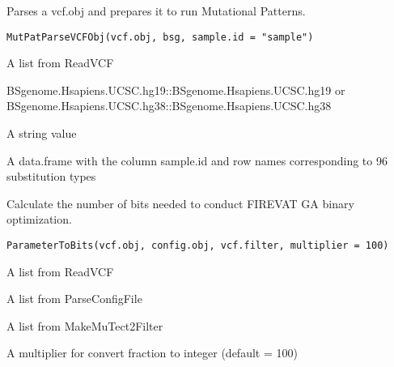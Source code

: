 \documentclass[letterpaper]{book}
\begin{document}
%
\begin{Description}\relax
Parses a vcf.obj and prepares it to run Mutational Patterns.
\end{Description}
%
\begin{Usage}
\begin{verbatim}
MutPatParseVCFObj(vcf.obj, bsg, sample.id = "sample")
\end{verbatim}
\end{Usage}
%
\begin{Arguments}
\begin{ldescription}
\item[\code{vcf.obj}] A list from ReadVCF

\item[\code{bsg}] BSgenome.Hsapiens.UCSC.hg19::BSgenome.Hsapiens.UCSC.hg19 or
BSgenome.Hsapiens.UCSC.hg38::BSgenome.Hsapiens.UCSC.hg38

\item[\code{sample.id}] A string value
\end{ldescription}
\end{Arguments}
%
\begin{Value}
A data.frame with the column sample.id and
row names corresponding to 96 substitution types
\end{Value}
%
\begin{Description}\relax
Calculate the number of bits needed to conduct FIREVAT GA binary optimization.
\end{Description}
%
\begin{Usage}
\begin{verbatim}
ParameterToBits(vcf.obj, config.obj, vcf.filter, multiplier = 100)
\end{verbatim}
\end{Usage}
%
\begin{Arguments}
\begin{ldescription}
\item[\code{vcf.obj}] A list from ReadVCF

\item[\code{config.obj}] A list from ParseConfigFile

\item[\code{vcf.filter}] A list from MakeMuTect2Filter

\item[\code{multiplier}] A multiplier for convert fraction to integer (default = 100)
\end{ldescription}
\end{Arguments}
\end{document}
